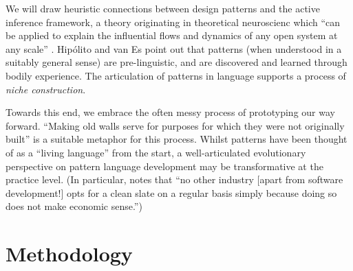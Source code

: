 \documentclass[acmlarge,timestamp]{acmart}
\begin{document}
We will draw heuristic connections between design patterns and the
active inference framework, a theory originating in theoretical
neuroscienc which “can be applied to explain the influential flows and
dynamics of any open system at any scale” \cite{Hiplito2022}.
Hip\'olito and van Es point out that patterns (when understood in a
suitably general sense) are pre-linguistic, and are discovered and
learned through bodily experience.  The articulation of patterns in
language supports a process of \emph{niche construction}.

Towards this end, we embrace the often messy process of prototyping
our way forward.  “Making old walls serve for purposes for which they
were not originally built” \cite{descartes1850discourse} is a suitable
metaphor for this process.  Whilst patterns have been thought of as a
“living language” \cite[p.~xvii]{alexander1977a} from the start, a
well-articulated evolutionary perspective on pattern language
development may be transformative at the practice level.  (In
particular, \citet[p.~xxiii]{lowy2019righting} notes that “no other
industry [apart from software development!] opts for a clean slate on
a regular basis simply because doing so does not make economic
sense.”)

\section{Methodology}
\label{sec:org134acbb}
\label{methods}
\end{document}
